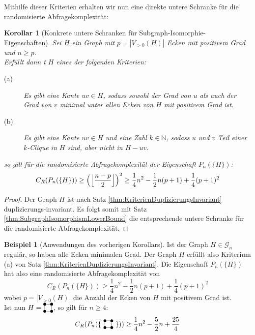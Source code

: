 \documentclass[10pt,a4paper]{scrreprt}
\newtheorem{corollary}[definition]{Korollar}
\theoremstyle{definition}
\newtheorem{examplex}{Beispiel}
\newenvironment{example}[1]
{ \begin{leftbar} \begin{examplex}#1}
{ \end{examplex} \ignorespacesafterend \end{leftbar} }
\newcommand{\Square}{
\begin{tikzpicture}[main_node/.style={circle,fill=black},
inner sep=1.5pt, baseline=2pt]

    \node[main_node] (1) at (0,0) {};
    \node[main_node] (2) at (0.35, 0)  {};
    \node[main_node] (3) at (0.35, 0.35) {};
    \node[main_node] (4) at (0, 0.35) {};

    \draw (1) -- (2) -- (3) -- (4) -- (1);
\end{tikzpicture}
}
\begin{document}
Mithilfe dieser Kriterien erhalten wir nun
eine direkte untere Schranke für die randomisierte Abfragekomplexität:
\begin{corollary}[Konkrete untere Schranken für Subgraph-Isomorphie-Eigenschaften]
Sei $H$ ein Graph mit $p=|V_{>0}(H)|$ Ecken mit positivem Grad
und $n \geq p$. \\
Erfüllt dann t $H$ eines der folgenden Kriterien:
\begin{description}
\item[(a)] Es gibt eine Kante $uv\in H$, sodass sowohl
           der Grad von $u$ als auch der Grad von $v$
           minimal unter allen Ecken von $H$ mit positivem
           Grad ist.
\item[(b)] Es gibt eine Kante $uv \in H$ und eine Zahl
           $k\in \mathbb{N}$, sodass $u$ und $v$
           Teil einer $k$-Clique in $H$ sind, aber nicht
           in $H-uv$.
\end{description}
so gilt für die randomisierte Abfragekomplexität der Eigenschaft 
$P_n(\{H\})$:
$$ C_R(P_n(\{H\})) \geq
\Big{ ( } \Big \lfloor  \frac{n-p}{2} \Big \rfloor \Big{)}^{2} \geq
\frac{1}{4}n^2 - \frac{1}{2}n(p+1) + \frac{1}{4}(p+1)^2
$$
\end{corollary}
\begin{proof}
Der Graph $H$ ist nach Satz \ref{thm:KriterienDuplizierungsInvariant}
duplizierungs-invariant. Es folgt somit mit 
Satz \ref{thm:SubgraphIsomorphismLowerBound} die entsprechende
untere Schranke für die randomisierte Abfragekomplexität.
\end{proof}

\begin{example}[Anwendungen des vorherigen Korollars]
Ist der Graph $H\in\mathcal{G}_n$ regulär, so haben
alle Ecken minimalen Grad. Der Graph $H$ erfüllt also Kriterium (a)
von Satz \ref{thm:KriterienDuplizierungsInvariant}.
Die Eigenschaft $P_n(\{H\})$ hat also eine randomisierte
Abfragekomplexität von 
$$ C_R(P_n(\{H\})) \geq
\frac{1}{4}n^2 - \frac{1}{2}n(p+1) + \frac{1}{4}(p+1)^2$$
wobei $p=|V_{>0}(H)|$ die Anzahl der Ecken von $H$ mit
positivem Grad ist. \\
Ist nun $H=\Square$, so gilt für $n\geq 4$:
$$ C_R(P_n(\{\ \Square \ \})) \geq
\frac{1}{4}n^2 - \frac{5}{2}n + \frac{25}{4}$$
\end{example}
\end{document}
